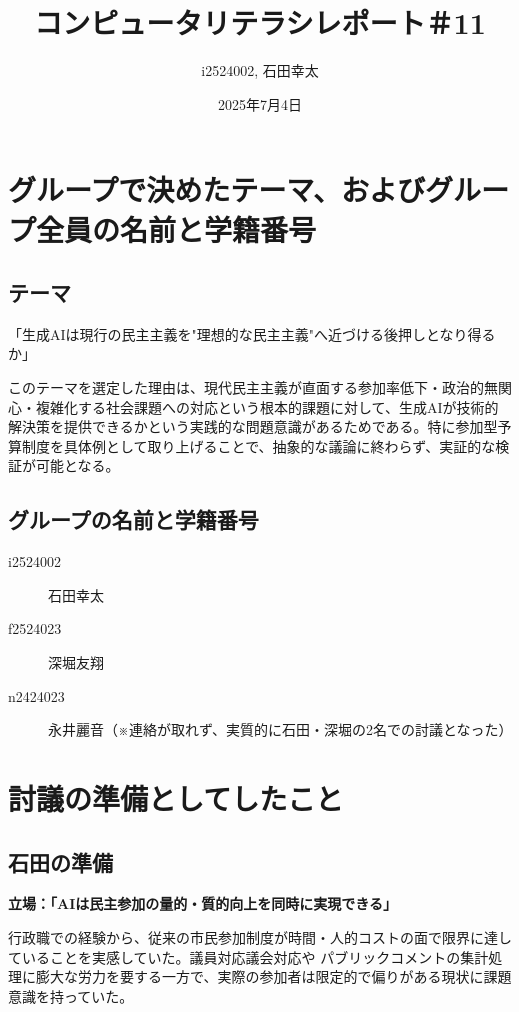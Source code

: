 \documentclass[12pt,a4j]{jarticle}
\begin{document}
\title{コンピュータリテラシレポート＃11}
\author{i2524002, 石田幸太}
\date{2025年7月4日}
\maketitle

\section{グループで決めたテーマ、およびグループ全員の名前と学籍番号}

\subsection{テーマ}
「生成AIは現行の民主主義を"理想的な民主主義"へ近づける後押しとなり得るか」

このテーマを選定した理由は、現代民主主義が直面する参加率低下・政治的無関心・複雑化する社会課題への対応という根本的課題に対して、生成AIが技術的解決策を提供できるかという実践的な問題意識があるためである。特に参加型予算制度を具体例として取り上げることで、抽象的な議論に終わらず、実証的な検証が可能となる。

\subsection{グループの名前と学籍番号}

\begin{description}
\item[i2524002] 石田幸太
\item[f2524023] 深堀友翔
\item[n2424023] 永井麗音（※連絡が取れず、実質的に石田・深堀の2名での討議となった）
\end{description}

\section{討議の準備としてしたこと}

\subsection{石田の準備}
\textbf{立場：「AIは民主参加の量的・質的向上を同時に実現できる」}

行政職での経験から、従来の市民参加制度が時間・人的コストの面で限界に達していることを実感していた。議員対応議会対応や パブリックコメントの集計処理に膨大な労力を要する一方で、実際の参加者は限定的で偏りがある現状に課題意識を持っていた。
\end{document}
